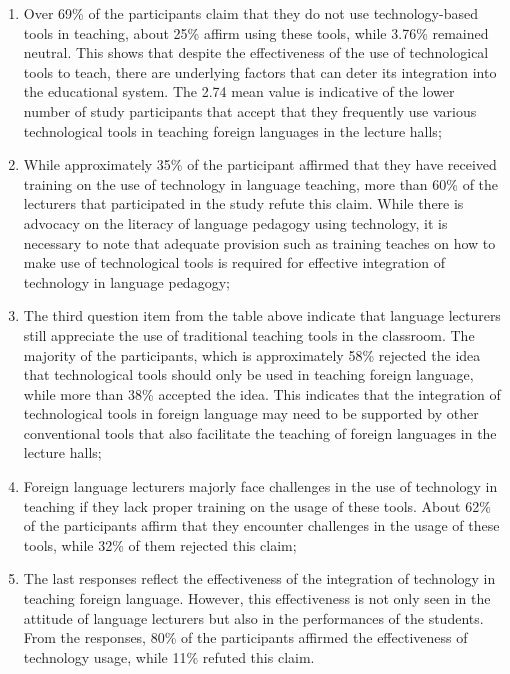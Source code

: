 \documentclass[english]{textolivre}
\begin{document}
\begin{enumerate}
    \item Over 69\% of the participants claim that they do not use technology-based tools in teaching, about 25\% affirm using these tools, while 3.76\% remained neutral. This shows that despite the effectiveness of the use of technological tools to teach, there are underlying factors that can deter its integration into the educational system. The 2.74 mean value is indicative of the lower number of study participants that accept that they frequently use various technological tools in teaching foreign languages in the lecture halls;
    \item While approximately 35\% of the participant affirmed that they have received training on the use of technology in language teaching, more than 60\% of the lecturers that participated in the study refute this claim. While there is advocacy on the literacy of language pedagogy using technology, it is necessary to note that adequate provision such as training teaches on how to make use of technological tools is required for effective integration of technology in language pedagogy;
    \item The third question item from the table above indicate that language lecturers still appreciate the use of traditional teaching tools in the classroom. The majority of the participants, which is approximately 58\% rejected the idea that technological tools should only be used in teaching foreign language, while more than 38\% accepted the idea. This indicates that the integration of technological tools in foreign language may need to be supported by other conventional tools that also facilitate the teaching of foreign languages in the lecture halls;
    \item Foreign language lecturers majorly face challenges in the use of technology in teaching if they lack proper training on the usage of these tools. About 62\% of the participants affirm that they encounter challenges in the usage of these tools, while 32\% of them rejected this claim;
    \item The last responses reflect the effectiveness of the integration of technology in teaching foreign language. However, this effectiveness is not only seen in the attitude of language lecturers but also in the performances of the students. From the responses, 80\% of the participants affirmed the effectiveness of technology usage, while 11\% refuted this claim.
\end{enumerate}
\end{document}
